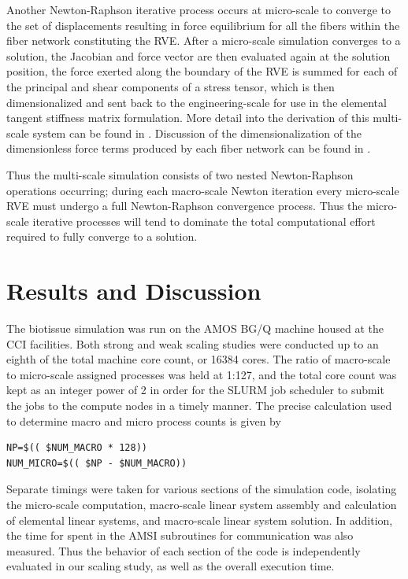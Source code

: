 \documentclass[11pt]{article}
\begin{document}
Another Newton-Raphson iterative process occurs at micro-scale to converge to the set of displacements resulting in force equilibrium for all the fibers within the fiber network constituting the RVE. After a micro-scale simulation converges to a solution, the Jacobian and force vector are then evaluated again at the solution position, the force exerted along the boundary of the RVE is summed for each of the principal and shear components of a stress tensor, which is then dimensionalized and sent back to the engineering-scale for use in the elemental tangent stiffness matrix formulation. More detail into the derivation of this multi-scale system can be found in \cite{stylianopoulos2008thesis} \cite{agoram2001coupled} \cite{stylianopoulos2007multiscale} . Discussion of the dimensionalization of the dimensionless force terms produced by each fiber network can be found in \cite{stylianopoulos2007volume} \cite{chandran2007deterministic}.

Thus the multi-scale simulation consists of two nested Newton-Raphson operations occurring; during each macro-scale Newton iteration every micro-scale RVE must undergo a full Newton-Raphson convergence process. Thus the micro-scale iterative processes will tend to dominate the total computational effort required to fully converge to a solution.

\section{Results and Discussion}\label{results}
The biotissue simulation was run on the AMOS BG/Q machine housed at the CCI facilities. Both strong and weak scaling studies were conducted up to an eighth of the total machine core count, or 16384 cores. The ratio of macro-scale to micro-scale assigned processes was held at 1:127, and the total core count was kept as an integer power of 2 in order for the SLURM job scheduler to submit the jobs to the compute nodes in a timely manner. The precise calculation used to determine macro and micro process counts is given by
%
\begin{verbatim}
NP=$(( $NUM_MACRO * 128))
NUM_MICRO=$(( $NP - $NUM_MACRO))
\end{verbatim}
\label{macro micro ratio}
%

Separate timings were taken for various sections of the simulation code, isolating the micro-scale computation, macro-scale linear system assembly and calculation of elemental linear systems, and macro-scale linear system solution. In addition, the time for spent in the AMSI subroutines for communication was also measured. Thus the behavior of each section of the code is independently evaluated in our scaling study, as well as the overall execution time.
\end{document}
